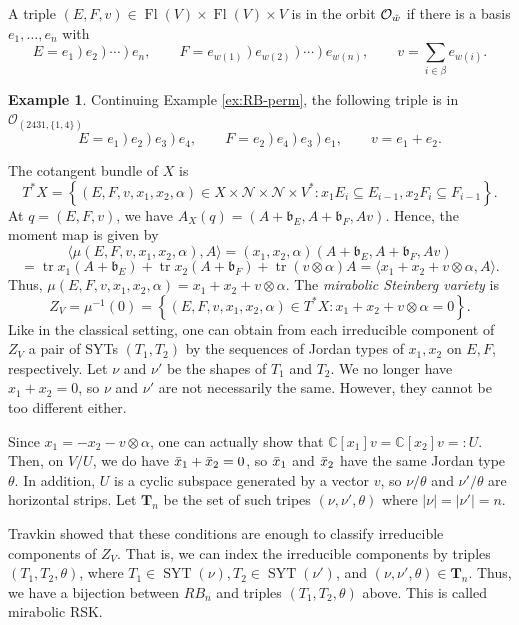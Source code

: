 \documentclass[12pt,a4paper]{article}
\def\Fl{\operatorname{Fl}}
\def\FlVV{\Fl(V) \times \Fl(V)}
\def\tr{\operatorname{tr}}
\theoremstyle{plain}
\theoremstyle{definition}
\newtheorem{example}[thm]{Example}
\theoremstyle{remark}
\newcommand{\SYT}{\operatorname{SYT}}
\newcommand{\bfrak}{\mathfrak{b}}
\newcommand{\cN}{\mathcal{N}}
\newcommand{\cO}{\mathcal{O}}
\newcommand{\bfT}{\mathbf{T}}
\newcommand{\CC}{\mathbb{C}}
\begin{document}
    A triple $(E,F,v) \in \FlVV \times V$ is in the orbit $\cO_{\Tilde{w}}$ if there is a basis $e_1,\ldots,e_n$ with
    \[
    E = e_{1}~)~e_{2}~)~\cdots ~)~e_{n},\qquad
    F = e_{w(1)}~)~ e_{w(2)}~)~\cdots~)~e_{w(n)}, \qquad v= \sum_{i\in\beta} e_{w(i)}.
    \]

    \begin{example}\label{ex:RB-orbit}
        Continuing Example \ref{ex:RB-perm}, the following triple is in $\cO_{(2431,\{1,4\})}$
        \[
        E = e_{1}~)~e_{2}~)~e_3 ~)~e_4,\qquad
        F = e_{2}~)~ e_{4}~)~e_3~)~e_{1}, \qquad v= e_1 + e_2.
        \]
    \end{example}
    
    The cotangent bundle of $X$ is
    \[
    T^*X = \left\{(E,F,v,x_1,x_2,\alpha)\in X \times\cN \times\cN \times V^*: x_1E_i \subseteq E_{i-1}, x_2F_i\subseteq F_{i-1}\right\}.
    \]
    At $q = (E,F,v)$, we have $A_X(q) = (A + \bfrak_E,A + \bfrak_F, Av)$. Hence, the moment map is given by
    \[
    \langle\mu(E,F,v,x_1,x_2,\alpha),A\rangle=(x_1,x_2,\alpha)(A + \bfrak_E, A + \bfrak_F,Av)
    \]
    \[
    = \tr x_1(A + \bfrak_E) + \tr x_2 (A + \bfrak_F) + \tr (v\otimes \alpha)A = \langle x_1 + x_2 + v\otimes \alpha, A \rangle.
    \]
    Thus, $\mu(E,F,v,x_1,x_2,\alpha) = x_1+x_2 + v\otimes \alpha$. The \textit{mirabolic Steinberg variety} is
    \[
    Z_V = \mu^{-1}(0) = \left\{(E,F,v,x_1,x_2,\alpha)\in T^*X : x_1 + x_2 + v\otimes\alpha = 0\right\}.
    \]
    Like in the classical setting, one can obtain from each irreducible component of $Z_V$ a pair of SYTs $(T_1,T_2)$ by the sequences of Jordan types of $x_1,x_2$ on $E,F$, respectively. Let $\nu$ and $\nu'$ be the shapes of $T_1$ and $T_2$. We no longer have $x_1 + x_2 = 0$, so $\nu$ and $\nu'$ are not necessarily the same. However, they cannot be too different either.
    
    Since $x_1 = -x_2 - v\otimes\alpha$, one can actually show that $\CC[x_1] v = \CC[x_2]v =:U$. Then, on $V/U$, we do have $\Bar{x}_1 + \Bar{x}_2 = 0$, so $\Bar{x}_1$ and $\Bar{x}_2$ have the same Jordan type $\theta$. In addition, $U$ is a cyclic subspace generated by a vector $v$, so $\nu/\theta$ and $\nu'/\theta$ are horizontal strips. Let $\bfT_n$ be the set of such tripes $(\nu,\nu',\theta)$ where $|\nu| = |\nu'| = n$.

    Travkin \cite[Proposition 1]{travkin2009mirabolic} showed that these conditions are enough to classify irreducible components of $Z_V$. That is, we can index the irreducible components by triples $(T_1,T_2,\theta)$, where $T_1\in \SYT(\nu), T_2 \in \SYT(\nu')$, and $(\nu,\nu',\theta) \in \bfT_n$. Thus, we have a bijection between $RB_n$ and triples $(T_1,T_2,\theta)$ above. This is called mirabolic RSK.
\end{document}
